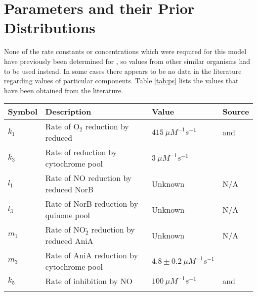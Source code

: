 
\section{Parameters and their Prior Distributions}

None of the rate constants or concentrations which were required for this model have previously been determined for \Nsm, so values from other similar organisms had to be used instead. In some cases there appears to be no data in the literature regarding values of particular components. Table \ref{tab:ps} lists the values that have been obtained from the literature.

\begin{table}[tbp]
\begin{center}
\begin{tabular}{>{\centering}m{1.7cm}>{\centering}m{6.2cm}>{\centering}m{2.5cm}>{\centering}m{2.8cm}}
\toprule
\textbf{Symbol} & \textbf{Description} & \textbf{Value} & \textbf{Source}
\tabularnewline
\midrule
$k_1$ & Rate of O$_{\textrm{2}}$ reduction by reduced \cbbthree{} & $415~\mu M^{-1} s^{-1}$ & \citet{Forte2001} and \citet{Hunter2007}
\tabularnewline\noalign{\smallskip}\hline\noalign{\smallskip}

$k_3$ & Rate of \cbbthree{} reduction by cytochrome pool & $3~\mu M^{-1} s^{-1}$ & \citet{Chang2010}
\tabularnewline\noalign{\smallskip}\hline\noalign{\smallskip}

$l_1$ & Rate of NO reduction by reduced NorB & Unknown & N/A
\tabularnewline\noalign{\smallskip}\hline\noalign{\smallskip}

$l_3$ & Rate of NorB reduction by quinone pool & Unknown & N/A
\tabularnewline\noalign{\smallskip}\hline\noalign{\smallskip}

$m_1$ & Rate of NO$_{\textrm{2}}^{\textrm{-}}$ reduction by reduced AniA & Unknown & N/A
\tabularnewline\noalign{\smallskip}\hline\noalign{\smallskip}

$m_3$ & Rate of AniA reduction by cytochrome pool & $4.8\pm0.2~\mu M^{-1}s^{-1}$ & \citet{Nojiri2009}
\tabularnewline\noalign{\smallskip}\hline\noalign{\smallskip}

$k_5$ & Rate of \cbbthree{} inhibition by NO & $100~\mu M ^{-1} s ^{-1}$ & \citet{Giuffre2000} and \citet{Blackmore1991}
\tabularnewline\noalign{\smallskip}\hline\noalign{\smallskip}


\end{tabular}
\end{center}
\end{table}

